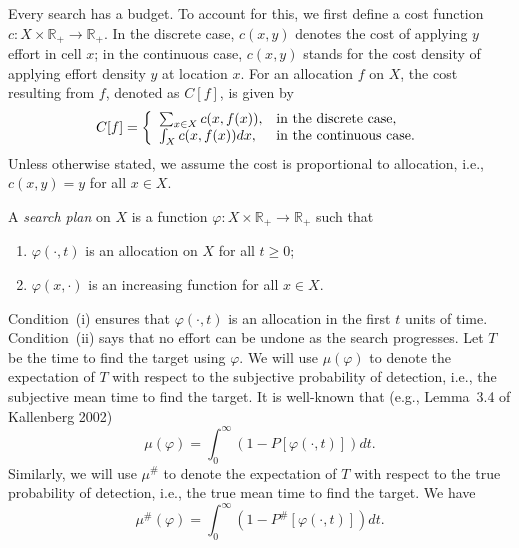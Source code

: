 \documentclass[12pt]{article}
\theoremstyle{plain}
\theoremstyle{definition}
\theoremstyle{remark}
\begin{document}
Every search has a budget.  To account for this, we first define a cost function $c: X \times \mathbb{R}_+ \rightarrow \mathbb{R}_+$.  In the discrete case,  $c(x,  y)$ denotes the cost of applying $y$ effort in cell $x$; in the continuous case, $c(x, y)$ stands for the cost density of applying effort density $y$ at location $x$. For an allocation $f$ on $X$, the cost resulting from $f$, denoted as $C[f]$, is given by
\[
C[f]=\left\{
		                           \begin{array}{ll}
		                           \sum_{x\in X} c(x, f(x)),& \hbox{in the discrete case,} \\
					\int_Xc(x, f(x))dx, & \hbox{in the continuous case.} 
		                          \end{array}
		                         \right.
\]
Unless otherwise stated,  we assume the cost is proportional to allocation, i.e.,  $c(x, y)=y$ for all $x\in X$. 

A \emph{search plan} on $X$ is a function $\varphi: X\times \mathbb{R}_+\rightarrow \mathbb{R}_+$ such that
\begin{enumerate}
\item[(i)]$\varphi(\cdot, t)$ is an allocation on $X$ for all $t\geq 0$;
\item[(ii)]$\varphi(x, \cdot)$ is an increasing function for all $x\in X$.
\end{enumerate}
Condition~(i)  ensures that $\varphi(\cdot, t)$ is an allocation in the first $t$ units of time.  Condition~(ii) says that no effort can be undone as the search progresses.  Let $T$ be the time to find the target using $\varphi$.  We will use $\mu(\varphi)$ to denote the expectation of $T$ with respect to the subjective probability of detection, i.e., the subjective mean time to find the target. It is well-known that (e.g., Lemma~3.4 of Kallenberg 2002)
\begin{equation*}
\mu(\varphi)=\int_0^\infty  (1-P[\varphi(\cdot, t)])dt.
\end{equation*}
Similarly,  we will use $\mu^{\#}$ to denote the expectation of $T$ with respect to the true probability of detection, i.e., the true mean time to find the target. We have
\begin{equation}
\label{eq:truemean}
\mu^{\#} (\varphi)=\int_0^\infty(1-P^{\#}[\varphi(\cdot, t)])dt.
\end{equation}
\end{document}
